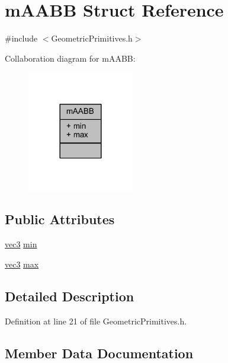 \hypertarget{structm_a_a_b_b}{}\section{m\+A\+A\+BB Struct Reference}
\label{structm_a_a_b_b}


{\ttfamily \#include $<$Geometric\+Primitives.\+h$>$}



Collaboration diagram for m\+A\+A\+BB\+:\nopagebreak
\begin{figure}[H]
\begin{center}
\leavevmode
\includegraphics[width=132pt]{structm_a_a_b_b__coll__graph}
\end{center}
\end{figure}
\subsection*{Public Attributes}
\begin{DoxyCompactItemize}
\item 
\hyperlink{_types_8h_a3d0ce73e3199de81565fb01632415288}{vec3} \hyperlink{structm_a_a_b_b_af759d65b18f76e266945883107dcafc8}{min}
\item 
\hyperlink{_types_8h_a3d0ce73e3199de81565fb01632415288}{vec3} \hyperlink{structm_a_a_b_b_a9866d0a5a3ceb5dbff2bf87372f3094a}{max}
\end{DoxyCompactItemize}


\subsection{Detailed Description}


Definition at line 21 of file Geometric\+Primitives.\+h.



\subsection{Member Data Documentation}
